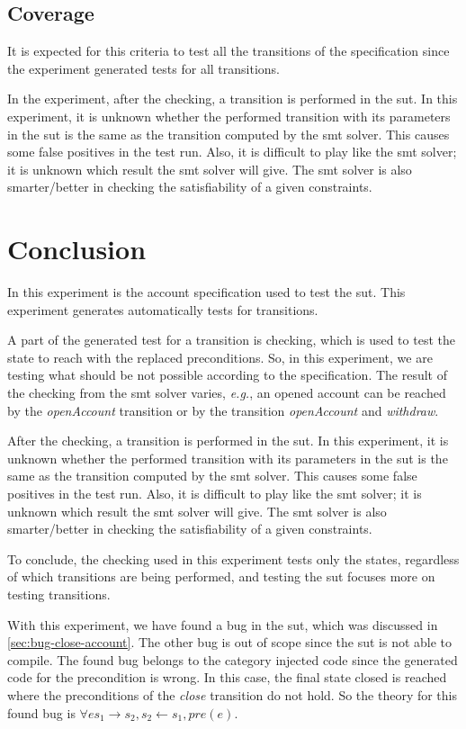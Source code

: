 \subsection{Coverage}
It is expected for this criteria to test all the transitions of the
specification since the experiment generated tests for all transitions.

In the experiment, after the checking, a transition
is performed in the \gls{sut}. In this experiment, it is unknown whether the
performed transition with its parameters in the \gls{sut} is the same as the
transition computed by the \gls{smt} solver. This causes some false positives in the
test run. Also, it is difficult to play like the \gls{smt} solver; it is unknown which
result the \gls{smt} solver will give. The \gls{smt} solver is also smarter/better in checking
the satisfiability of a given constraints.

\section{Conclusion}
In this experiment is the account specification used to test the \gls{sut}.
This experiment generates automatically tests for transitions.

A part of
the generated test for a transition is checking, which is used to test the state to
reach with the replaced preconditions. So, in this experiment, we are
testing what should be not possible according to the specification. The result
of the checking from the \gls{smt} solver varies, \textit{e.g.}, an opened account can be
reached by the \textit{openAccount} transition or by the transition
\textit{openAccount} and \textit{withdraw}.

After the checking, a transition
is performed in the \gls{sut}. In this experiment, it is unknown whether the
performed transition with its parameters in the \gls{sut} is the same as the
transition computed by the \gls{smt} solver. This causes some false positives in the
test run. Also, it is difficult to play like the \gls{smt} solver; it is unknown which
result the \gls{smt} solver will give. The \gls{smt} solver is also smarter/better in checking
the satisfiability of a given constraints.

To conclude, the checking used in this experiment tests only the states, regardless of which transitions are
being performed, and testing the \gls{sut} focuses more on testing transitions.

With this experiment, we have found a bug in the \gls{sut}, which was
discussed in \autoref{sec:bug-close-account}. The other bug is out of scope
since the \gls{sut} is not able to compile. The found bug belongs to the category
injected code since the generated code for the precondition is wrong. In this
case, the final state closed is reached where the preconditions of the \textit{close}
transition do not hold. So the theory for this found bug is
$\forall e s_{1} \to s_{2}, s_{2} \gets s_{1}, pre(e)$.

